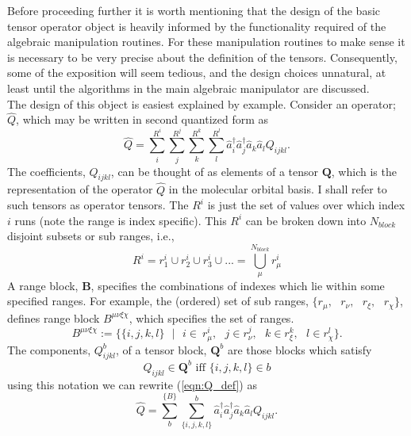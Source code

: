 \noindent Before proceeding further it is worth mentioning that the design of
the basic tensor operator object is heavily informed by the functionality
required of the algebraic manipulation routines. For these manipulation 
routines to make sense it is necessary to be very precise about the 
definition of the tensors. Consequently, some of the exposition will 
seem tedious, and the design choices unnatural, at least until the algorithms in the main algebraic
manipulator are discussed.\\ 

\noindent The design of this object is easiest explained by example. Consider an operator; $\hat{Q}$,
which may be written in second quantized form as
\begin{equation}
\hat{Q} =  \sum_{i}^{R^{i}}\sum_{j}^{R^{j}}\sum_{k}^{R^{k}}\sum_{l}^{R^{l}} \hat{a}^{\dagger}_{i} \hat{a}^{\dagger}_{j} \hat{a}_{k} \hat{a}_{l} Q_{ijkl}.
\label{eqn:Q_def}
\end{equation}
\noindent  The coefficients,
$Q_{ijkl}$, can be thought of as elements of a tensor $\mathbf{Q}$, which is
the representation of the operator $\hat{Q}$ in the molecular orbital basis.
I shall refer to such tensors as operator tensors. The $R^{i}$ is just the set
of values over which index $i$ runs (note the range is index specific). This
$R^{i}$ can be broken down into $N_{block}$ disjoint subsets or sub ranges, i.e.,
\begin{equation}
R^{i} = r_{1}^{i} \cup r_{2}^{i} \cup r_{3}^{i} \cup ... = \bigcup^{N_{block}}_{\mu} r_{\mu}^{i}
\end{equation}
\noindent A range block, $\mathbf{B}$, specifies the combinations of indexes which lie within some specified ranges. For example, the (ordered) set
of sub ranges, $\{ r_{\mu},\text{\ } r_{\nu}, \text{\ }r_{\xi}, \text{\ } r_{\chi} \}$, defines range block $B^{\mu\nu\xi\chi}$, which specifies the set
of ranges.
\begin{equation}
B^{\mu\nu\xi\chi} :=  \{ \{i,j,k,l\}  \text{\ }|  \text{\ }i \in \ r_{\mu}^{i} , \text{\ } j \in r_{\nu}^{j},  \text{\ } k \in r_{\xi}^{k},  \text{\ }l\in r^{l}_{\chi} \}.
\end{equation}
The components, $ Q_{ijkl}^{b}$, of a tensor block, $\mathbf{Q}^{b}$ are those blocks which satisfy
\begin{equation}
Q_{ijkl} \in \mathbf{Q}^{b} \text{ \ \ iff \ \ }  \{ i, j, k, l \} \in b   
\end{equation}
using this notation we can rewrite (\ref{eqn:Q_def}) as 
\begin{equation}
\hat{Q} =  \sum_{b}^{\{B\}} \sum_{\{i,j,k,l\}}^{b }
\hat{a}^{\dagger}_{i} \hat{a}^{\dagger}_{j} \hat{a}_{k} \hat{a}_{l} Q_{ijkl}.
\label{eqn:Q_block_def}
\end{equation}
\noindent 

